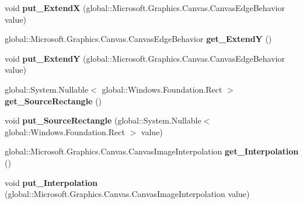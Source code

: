 \begin{DoxyCompactItemize}
void {\bfseries put\+\_\+\+ExtendX} (global\+::\+Microsoft.\+Graphics.\+Canvas.\+Canvas\+Edge\+Behavior value)
\item 
\mbox{\label{class_microsoft_1_1_graphics_1_1_canvas_1_1_brushes_1_1_canvas_image_brush_a6d17dd87d557c5dd892bcd91ed6d580c}} 
global\+::\+Microsoft.\+Graphics.\+Canvas.\+Canvas\+Edge\+Behavior {\bfseries get\+\_\+\+ExtendY} ()
\item 
\mbox{\label{class_microsoft_1_1_graphics_1_1_canvas_1_1_brushes_1_1_canvas_image_brush_a74ff40530cc12913c1a2aed1c6a29603}} 
void {\bfseries put\+\_\+\+ExtendY} (global\+::\+Microsoft.\+Graphics.\+Canvas.\+Canvas\+Edge\+Behavior value)
\item 
\mbox{\label{class_microsoft_1_1_graphics_1_1_canvas_1_1_brushes_1_1_canvas_image_brush_a026484de4f62a1ee93a4dbe3b556bc35}} 
global\+::\+System.\+Nullable$<$ global\+::\+Windows.\+Foundation.\+Rect $>$ {\bfseries get\+\_\+\+Source\+Rectangle} ()
\item 
\mbox{\label{class_microsoft_1_1_graphics_1_1_canvas_1_1_brushes_1_1_canvas_image_brush_a06ce9ecc2a14f31cc237bf4f1d636c3b}} 
void {\bfseries put\+\_\+\+Source\+Rectangle} (global\+::\+System.\+Nullable$<$ global\+::\+Windows.\+Foundation.\+Rect $>$ value)
\item 
\mbox{\label{class_microsoft_1_1_graphics_1_1_canvas_1_1_brushes_1_1_canvas_image_brush_aa876d16918c915a266a3e9223dc1d6d3}} 
global\+::\+Microsoft.\+Graphics.\+Canvas.\+Canvas\+Image\+Interpolation {\bfseries get\+\_\+\+Interpolation} ()
\item 
\mbox{\label{class_microsoft_1_1_graphics_1_1_canvas_1_1_brushes_1_1_canvas_image_brush_a733530cfb4590949e1eddf304a9e861f}} 
void {\bfseries put\+\_\+\+Interpolation} (global\+::\+Microsoft.\+Graphics.\+Canvas.\+Canvas\+Image\+Interpolation value)
\item 

\end{DoxyCompactItemize}
